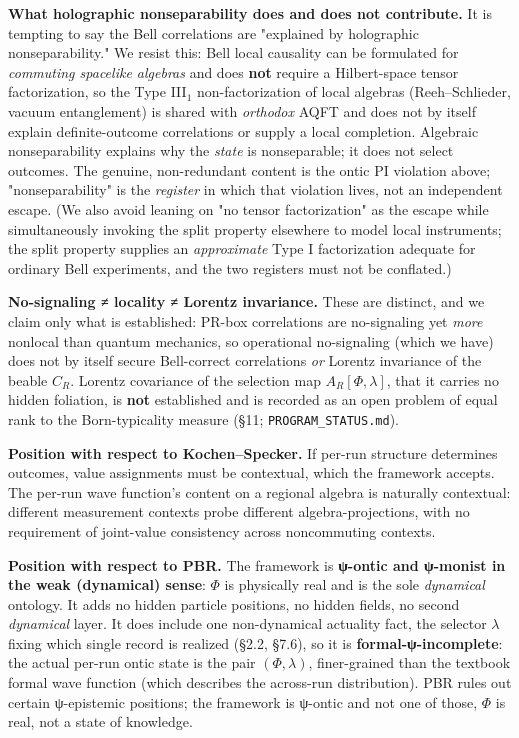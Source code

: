\documentclass[11pt,a4paper]{article}
\begin{document}
\textbf{What holographic nonseparability does and does not contribute.} It is tempting to say the Bell correlations are "explained by holographic nonseparability." We resist this: Bell local causality can be formulated for \emph{commuting spacelike algebras} and does \textbf{not} require a Hilbert-space tensor factorization, so the Type III$_1$ non-factorization of local algebras (Reeh–Schlieder, vacuum entanglement) is shared with \emph{orthodox} AQFT and does not by itself explain definite-outcome correlations or supply a local completion. Algebraic nonseparability explains why the \emph{state} is nonseparable; it does not select outcomes. The genuine, non-redundant content is the ontic PI violation above; "nonseparability" is the \emph{register} in which that violation lives, not an independent escape. (We also avoid leaning on "no tensor factorization" as the escape while simultaneously invoking the split property elsewhere to model local instruments; the split property supplies an \emph{approximate} Type I factorization adequate for ordinary Bell experiments, and the two registers must not be conflated.)

\textbf{No-signaling ≠ locality ≠ Lorentz invariance.} These are distinct, and we claim only what is established: PR-box correlations are no-signaling yet \emph{more} nonlocal than quantum mechanics, so operational no-signaling (which we have) does not by itself secure Bell-correct correlations \emph{or} Lorentz invariance of the beable $C_R$. Lorentz covariance of the selection map $A_R[\Phi,\lambda]$, that it carries no hidden foliation, is \textbf{not} established and is recorded as an open problem of equal rank to the Born-typicality measure (§11; \texttt{PROGRAM\_STATUS.md}).

\textbf{Position with respect to Kochen–Specker.} If per-run structure determines outcomes, value assignments must be contextual, which the framework accepts. The per-run wave function's content on a regional algebra is naturally contextual: different measurement contexts probe different algebra-projections, with no requirement of joint-value consistency across noncommuting contexts.

\textbf{Position with respect to PBR.} The framework is \textbf{ψ-ontic and ψ-monist in the weak (dynamical) sense}: $\Phi$ is physically real and is the sole \emph{dynamical} ontology. It adds no hidden particle positions, no hidden fields, no second \emph{dynamical} layer. It does include one non-dynamical actuality fact, the selector $\lambda$ fixing which single record is realized (§2.2, §7.6), so it is \textbf{formal-ψ-incomplete}: the actual per-run ontic state is the pair $(\Phi, \lambda)$, finer-grained than the textbook formal wave function (which describes the across-run distribution). PBR rules out certain ψ-epistemic positions; the framework is ψ-ontic and not one of those, $\Phi$ is real, not a state of knowledge.
\end{document}
